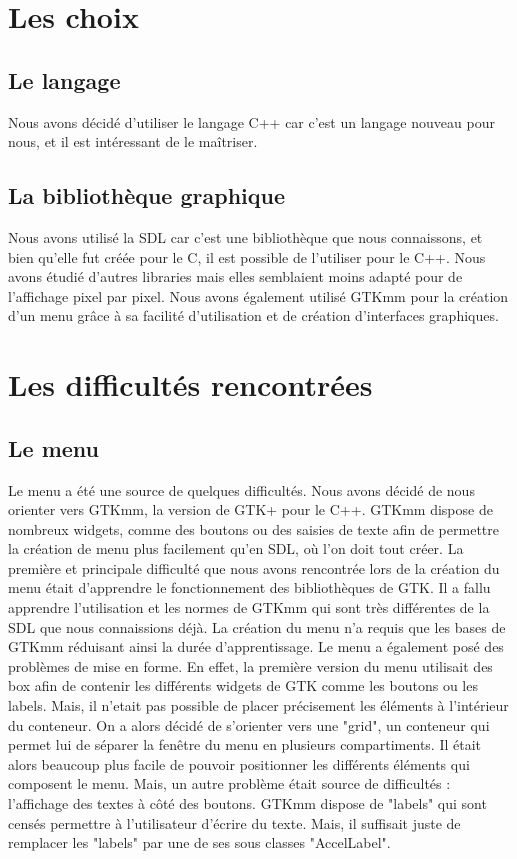 \documentclass{article}
\begin{document}
	\section{Les choix}

	\subsection{Le langage}
	Nous avons décidé d'utiliser le langage C++ car c'est un langage nouveau pour nous, et il est intéressant de le maîtriser.

	\subsection{La bibliothèque graphique}
	Nous avons utilisé la SDL car c'est une bibliothèque que nous connaissons, et bien qu'elle fut créée pour le C, il est possible de l'utiliser pour le C++.
	Nous avons étudié d'autres libraries mais elles semblaient moins adapté pour de l'affichage pixel par pixel.
	Nous avons également utilisé GTKmm pour la création d'un menu grâce à sa facilité d'utilisation et de création d'interfaces graphiques.

	\section{Les difficultés rencontrées}

	\subsection{Le menu}
	Le menu a été une source de quelques difficultés.
	Nous avons décidé de nous orienter vers GTKmm, la version de GTK+ pour le C++.
	GTKmm dispose de nombreux widgets, comme des boutons ou des saisies de texte afin de permettre la création de menu plus facilement qu'en SDL, où l'on doit tout créer.
	La première et principale difficulté que nous avons rencontrée lors de la création du menu était d'apprendre le fonctionnement des bibliothèques de GTK. Il a fallu apprendre l'utilisation et les normes de GTKmm qui sont très différentes de la SDL que nous connaissions déjà.
	La création du menu n'a requis que les bases de GTKmm réduisant ainsi la durée d'apprentissage.
	Le menu a également posé des problèmes de mise en forme.
	En effet, la première version du menu utilisait des box afin de contenir les différents widgets de GTK comme les boutons ou les labels.
	Mais, il n'etait pas possible de placer précisement les éléments à l'intérieur du conteneur.
	On a alors décidé de s'orienter vers une "grid", un conteneur qui permet lui de séparer la fenêtre du menu en plusieurs compartiments.
	Il était alors beaucoup plus facile de pouvoir positionner les différents éléments qui composent le menu.
	Mais, un autre problème était source de difficultés : l'affichage des textes à côté des boutons.
	GTKmm dispose de "labels" qui sont censés permettre à l'utilisateur d'écrire du texte.
	Mais, il suffisait juste de remplacer les "labels" par une de ses sous classes "AccelLabel".
\end{document}
